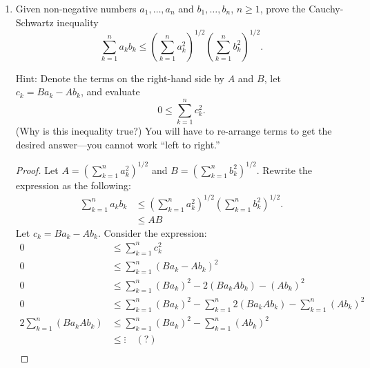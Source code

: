 \documentclass[12pt]{amsart}
\begin{document}
\begin{enumerate}
\begin{proof}
Fix $x>-1$. We will proceed by induction on $n$. As a base case, when $n=1$, we have:
\begin{align*}
(1+x)^0& \geq 1+0x \\
1& \geq 1
\end{align*}
Which is a true statement. Suppose the statement $(1+x)^k\geq 1+kx$ is true. Then we want to show that $(1+x)^{(k+1)}\geq 1+(k+1)x$ is also true. Because we've fixed $x>-1$, we can say that the statement $(1+x) \geq 0$ is true. By the ordering axioms, we now have:
\begin{align*}
(1+x)^k&\geq 1+kx \\
(1+x)^k(1+x)&\geq (1+kx)(1+x) \\
(1+x)^{(k+1)}&\geq 1 + x + kx + kx^2 \\
&\geq 1 + (k+1)x + kx^2
\end{align*}
This isn't exactly what we were looking for, because of the extraneous $kx^2$ term. Consider, however, that since we've fixed $x>-1$,
\[1 + (k + 1)x + kx^2 \geq 1 + (k + 1)x \]
Therefore we can say that the statement $(1+x)^{(k+1)}\geq 1 + (k+1)x$ is true, and thus $(1+x)^k\geq 1+kx$ is true for all $k\geq 1$.
\end{proof}
\item Given non-negative numbers $a_1,\ldots, a_n$ and $b_1,\ldots,b_n$, $n\geq 1$, prove
  the Cauchy-Schwartz inequality 
%
\[ \sum_{k=1}^n a_kb_k \leq \left(\sum_{k=1}^n a_k^2 \right)^{1/2}
\left(\sum_{k=1}^n b_k^2 \right)^{1/2}. \]
%

Hint:  Denote the terms on the right-hand side by $A$ and $B$, let
$c_k=Ba_k-Ab_k$, and evaluate
%
\[ 0\leq \sum_{k=1}^n c_k^2. \]
%
(Why is this inequality true?)  You will have to re-arrange terms to
get the desired answer---you cannot work ``left to right.''

\begin{proof}
Let $A=\left(\sum_{k=1}^n a_k^2 \right)^{1/2}$ and $B=\left(\sum_{k=1}^n b_k^2 \right)^{1/2}$. Rewrite the expression as the following:
\begin{align*}
\sum_{k=1}^n a_kb_k &\leq \left(\sum_{k=1}^n a_k^2 \right)^{1/2}
\left(\sum_{k=1}^n b_k^2 \right)^{1/2}. \\
&\leq A B
\end{align*}
Let $c_k=Ba_k-Ab_k$. Consider the expression:
\begin{align*}
0 &\leq \sum_{k=1}^n c_k^2 \\
0 &\leq \sum_{k=1}^n (Ba_k-Ab_k)^2 \\
0 &\leq \sum_{k=1}^n (Ba_k)^2 - 2(Ba_kAb_k) - (Ab_k)^2 \\
0 &\leq \sum_{k=1}^n (Ba_k)^2 - \sum_{k=1}^n2(Ba_kAb_k) - \sum_{k=1}^n(Ab_k)^2 \\
2\sum_{k=1}^n(Ba_kAb_k) &\leq \sum_{k=1}^n (Ba_k)^2 - \sum_{k=1}^n(Ab_k)^2 \\
&\leq \vdots \quad (?) \\
\end{align*}
\end{proof}


\end{enumerate}
\end{document}
